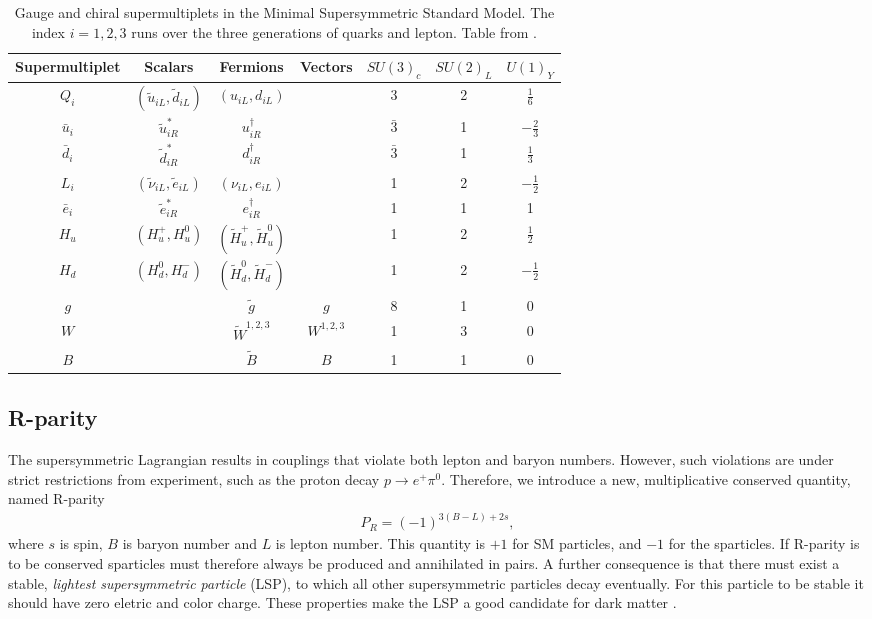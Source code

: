 \documentclass[twoside,english]{uiofysmaster}
\begin{document}
\begin{table}
\centering
\begin{tabular}{c|c|c|c|c|c|c}
Supermultiplet & Scalars & Fermions & Vectors & $SU(3)_c$ & $SU(2)_L$ & $U(1)_Y$\\
\hline
$Q_i$ & $(\tilde{u}_{iL}, \tilde{d}_{iL})$ & $(u_{iL}, d_{iL})$ & & 3 & 2 & $\frac{1}{6}$\\
$\bar{u}_i$ & $\tilde{u}_{iR}^*$ & $u_{iR}^{\dagger}$ && $\bar{3}$ & 1 & $- \frac{2}{3}$\\
$\bar{d}_i$ & $\tilde{d}_{iR}^*$ & $d_{iR}^{\dagger}$ && $\bar{3}$ & 1 & $\frac{1}{3}$\\
\hline
$L_i$ & $(\tilde{\nu}_{iL}, \tilde{e}_{iL})$ & $(\nu_{iL}, e_{iL})$& & 1 & 2 & $- \frac{1}{2}$\\
$\bar{e}_i$ & $\tilde{e}_{iR}^*$ & $e_{iR}^{\dagger}$ && 1 & 1& 1\\
\hline
$H_u$ & $(H_u^+, H_u^0)$ & $(\tilde{H}_u^+, \tilde{H}_u^0)$ & & 1 & 2 & $\frac{1}{2}$\\
$H_d$ & $(H_d^0, H_d^-)$ & $(\tilde{H}_d^0, \tilde{H}_d^-)$ && 1 & 2 & $ - \frac{1}{2}$\\
\hline
$g$ & & $\tilde{g}$ & $g$ & 8 & 1 & 0\\
$W$ && $\tilde{W}^{1,2,3}$ & $W^{1,2,3}$ & 1 & 3 & 0 \\
$B$ && $\tilde{B}$ & $B$ & 1 & 1 & 0
\end{tabular}
\caption{Gauge and chiral supermultiplets in the Minimal Supersymmetric Standard Model. The index $i=1,2,3$ runs over the three generations of quarks and lepton. Table from \cite{kvellestad2015chasing}.}
\label{Tab:: Phys. back. : MSSM multiplets}
\end{table}

\subsection{R-parity}

The supersymmetric Lagrangian results in couplings that violate both lepton and baryon numbers. However, such violations are under strict restrictions from experiment, such as the proton decay $p \rightarrow e^+ \pi^0$. Therefore, we introduce a new, multiplicative conserved quantity, named R-parity \cite{Patrignani:2016xqp}
\begin{align}\label{Eq:: R-parity}
P_R = (-1)^{3(B-L) +2s},
\end{align}
where $s$ is spin, $B$ is baryon number and $L$ is lepton number. This quantity is $+1$ for SM particles, and $-1$ for the sparticles. If R-parity is to be conserved sparticles must therefore always be produced and annihilated in pairs. A further consequence is that there must exist a stable, \textit{lightest supersymmetric particle} (LSP), to which all other supersymmetric particles decay eventually. For this particle to be stable it should have zero eletric and color charge. These properties make the LSP a good candidate for dark matter \cite{weinberg_1995}.
\end{document}
